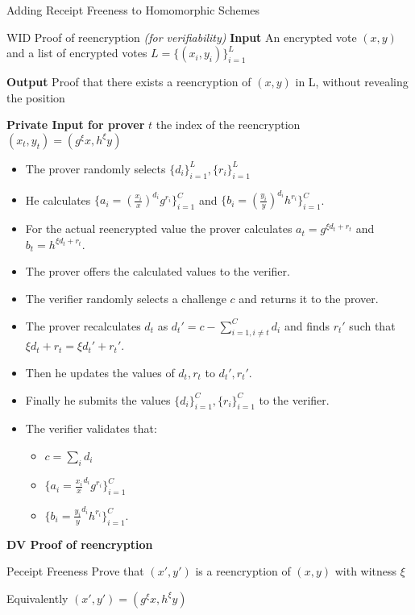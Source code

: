 \documentclass{beamer}
\begin{document}
\begin{frame}[allowframebreaks]{Adding Receipt Freeness to Homomorphic Schemes \cite{HS00}}
\framebreak

\begin{block}{WID Proof of reencryption \textit{(for verifiability)}} 
\textbf{Input} An encrypted vote $(x,y)$ and a list of encrypted votes $L=\{(x_i,y_i)\}_{i=1}^L$

\textbf{Output} Proof that there exists a reencryption of $(x,y)$ in L, without revealing the position

\textbf{Private Input for prover} $t$ the index of the reencryption $(x_t,y_t) = (g^{\xi}x,h^{\xi}y)$ 
\end{block}

\begin{itemize}
\item The prover randomly selects $\{ d_i \}_{i=1}^L, \{ r_i \}_{i=1}^L$ 
\item He calculates $\{ a_i = (\frac{x_i}{x})^{d_i} g^{r_i} \}_{i=1}^C$ and $\{ b_i = (\frac{y_i}{y})^{d_i} h^{r_i} \}_{i=1}^C$. 
\item For the actual reencrypted value the prover calculates $a_t = g^{\xi d_t + r_t}$ and $b_t = h^{\xi d_t + r_t}$. 
\item The prover offers the calculated values to the  verifier.
\item The verifier randomly selects a challenge $c$ and returns it to the prover.
\item The prover recalculates $d_t$ as $d_t' = c - \sum_{i=1, i \neq t}^C d_i$ and finds $r_t'$ such that $\xi d_t + r_t = \xi d_t' + r_t'$. 
\item Then he updates the values of $d_t,r_t$ to $d_t',r_t'$. 
\item Finally he submits the values $\{ d_i \}_{i=1}^C, \{ r_i \}_{i=1}^C$ to the verifier.
\item The verifier validates that:
\begin{itemize}
\item $c=\sum_i d_i$
\item $\{ a_i = \frac{x_i}{x}^{d_i} g^{r_i} \}_{i=1}^C$
\item $\{ b_i = \frac{y_i}{y}^{d_i} h^{r_i} \}_{i=1}^C$.
\end{itemize}
\end{itemize}
 
\framebreak

\textbf{DV Proof of reencryption}
\begin{block}{Ρeceipt Freeness}
Prove that $(x',y')$ is a reencryption of $(x,y)$ with witness $\xi$ 

Equivalently $(x',y')=(g^\xi x,h^\xi y)$


\end{block}
\end{frame}
\end{document}
